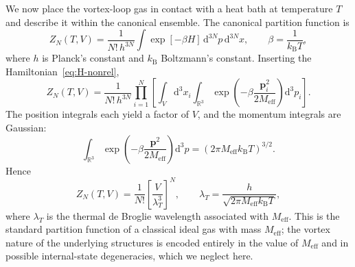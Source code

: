 \documentclass[11pt]{article}
\begin{document}
            We now place the vortex-loop gas in contact with a heat bath at temperature $T$ and
            describe it within the canonical ensemble. The canonical partition function is
            \begin{equation}
                Z_N(T,V)
                = \frac{1}{N!\,h^{3N}}
                \int \exp[-\beta H]\,
                \mathrm{d}^{3N}p\,\mathrm{d}^{3N}x,
                \qquad \beta = \frac{1}{k_{\mathrm B}T},
                \label{eq:ZN-def}
            \end{equation}
            where $h$ is Planck's constant and $k_{\mathrm B}$ Boltzmann's constant.
            Inserting the Hamiltonian~\eqref{eq:H-nonrel},
            \begin{equation}
                Z_N(T,V)
                = \frac{1}{N!\,h^{3N}}
                \prod_{i=1}^{N}
                \left[
                    \int_{V} \mathrm{d}^3x_i
                    \int_{\mathbb{R}^3} \exp\!\left(
                                                  -\beta\frac{\boldsymbol{p}_i^2}{2M_{\mathrm{eff}}}
                \right)\mathrm{d}^3p_i
                \right].
            \end{equation}
            The position integrals each yield a factor of $V$, and the momentum integrals are
            Gaussian:
            \begin{equation}
                \int_{\mathbb{R}^3}
                \exp\!\left(-\beta\frac{\boldsymbol{p}^2}{2M_{\mathrm{eff}}}\right)
                \mathrm{d}^3p
                = \left( 2\pi M_{\mathrm{eff}} k_{\mathrm B}T \right)^{3/2}.
            \end{equation}
            Hence
            \begin{equation}
                Z_N(T,V)
                = \frac{1}{N!}
                \left[
                    \frac{V}{\lambda_T^3}
                \right]^{\!N},
                \qquad
                \lambda_T
                = \frac{h}{\sqrt{2\pi M_{\mathrm{eff}} k_{\mathrm B}T}},
                \label{eq:ZN-final}
            \end{equation}
            where $\lambda_T$ is the thermal de Broglie wavelength associated with $M_{\mathrm{eff}}$.
            This is the standard partition function of a classical ideal gas with mass
            $M_{\mathrm{eff}}$; the vortex nature of the underlying structures is encoded entirely
            in the value of $M_{\mathrm{eff}}$ and in possible internal-state degeneracies, which
            we neglect here.
\end{document}

